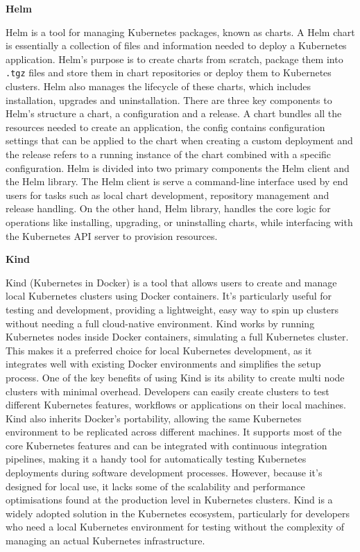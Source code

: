 \clearpage

\textbf{Helm}

Helm is a tool for managing Kubernetes packages, known as charts. A Helm chart is essentially a collection of files and information needed to deploy a Kubernetes application. Helm's purpose is to create charts from scratch, package them into \texttt{.tgz} files and store them in chart repositories or deploy them to Kubernetes clusters. Helm also manages the lifecycle of these charts, which includes installation, upgrades and uninstallation. There are three key components to Helm's structure a chart, a configuration and a release. A chart bundles all the resources needed to create an application, the config contains configuration settings that can be applied to the chart when creating a custom deployment and the release refers to a running instance of the chart combined with a specific configuration. Helm is divided into two primary components the Helm client and the Helm library. The Helm client is serve a command-line interface used by end users for tasks such as local chart development, repository management and release handling. On the other hand, Helm library, handles the core logic for operations like installing, upgrading, or uninstalling charts, while interfacing with the Kubernetes API server to provision resources. \cite{helm_docs}

\textbf{Kind}

Kind (Kubernetes in Docker) is a tool that allows users to create and manage local Kubernetes clusters using Docker containers. It's particularly useful for testing and development, providing a lightweight, easy way to spin up clusters without needing a full cloud-native environment. Kind works by running Kubernetes nodes inside Docker containers, simulating a full Kubernetes cluster. This makes it a preferred choice for local Kubernetes development, as it integrates well with existing Docker environments and simplifies the setup process. One of the key benefits of using Kind is its ability to create multi node clusters with minimal overhead. Developers can easily create clusters to test different Kubernetes features, workflows or applications on their local machines. Kind also inherits Docker's portability, allowing the same Kubernetes environment to be replicated across different machines. It supports most of the core Kubernetes features and can be integrated with continuous integration  pipelines, making it a handy tool for automatically testing Kubernetes deployments during software development processes. However, because it's designed for local use, it lacks some of the scalability and performance optimisations found at the production level in Kubernetes clusters. Kind is a widely adopted solution in the Kubernetes ecosystem, particularly for developers who need a local Kubernetes environment for testing without the complexity of managing an actual Kubernetes infrastructure. \cite{kind_Kubernetes}


